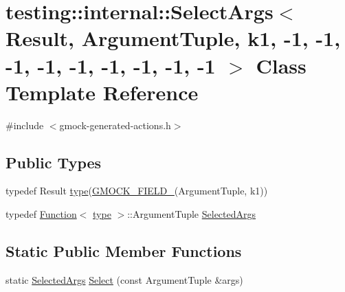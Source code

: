\hypertarget{classtesting_1_1internal_1_1SelectArgs_3_01Result_00_01ArgumentTuple_00_01k1_00_01-1_00_01-1_00_6a5fc7802a60cf36c89bd10623cc9552}{}\section{testing\+::internal\+::Select\+Args$<$ Result, Argument\+Tuple, k1, -\/1, -\/1, -\/1, -\/1, -\/1, -\/1, -\/1, -\/1, -\/1 $>$ Class Template Reference}
\label{classtesting_1_1internal_1_1SelectArgs_3_01Result_00_01ArgumentTuple_00_01k1_00_01-1_00_01-1_00_6a5fc7802a60cf36c89bd10623cc9552}


{\ttfamily \#include $<$gmock-\/generated-\/actions.\+h$>$}

\subsection*{Public Types}
\begin{DoxyCompactItemize}
\item 
typedef Result \mbox{\hyperlink{classtesting_1_1internal_1_1SelectArgs_3_01Result_00_01ArgumentTuple_00_01k1_00_01-1_00_01-1_00_6a5fc7802a60cf36c89bd10623cc9552_af1aee025a91b513b1d90a200748377dc}{type}}(\mbox{\hyperlink{gmock-generated-actions_8h_a6eb3ce92b0613603057a20ec9e593317}{G\+M\+O\+C\+K\+\_\+\+F\+I\+E\+L\+D\+\_\+}}(Argument\+Tuple, k1))
\item 
typedef \mbox{\hyperlink{structtesting_1_1internal_1_1Function}{Function}}$<$ \mbox{\hyperlink{classtesting_1_1internal_1_1SelectArgs_3_01Result_00_01ArgumentTuple_00_01k1_00_01-1_00_01-1_00_6a5fc7802a60cf36c89bd10623cc9552_af1aee025a91b513b1d90a200748377dc}{type}} $>$\+::Argument\+Tuple \mbox{\hyperlink{classtesting_1_1internal_1_1SelectArgs_3_01Result_00_01ArgumentTuple_00_01k1_00_01-1_00_01-1_00_6a5fc7802a60cf36c89bd10623cc9552_a40e5cbd362d7bdd16d0d60a39b7e5c14}{Selected\+Args}}
\end{DoxyCompactItemize}
\subsection*{Static Public Member Functions}
\begin{DoxyCompactItemize}
\item 
static \mbox{\hyperlink{classtesting_1_1internal_1_1SelectArgs_3_01Result_00_01ArgumentTuple_00_01k1_00_01-1_00_01-1_00_6a5fc7802a60cf36c89bd10623cc9552_a40e5cbd362d7bdd16d0d60a39b7e5c14}{Selected\+Args}} \mbox{\hyperlink{classtesting_1_1internal_1_1SelectArgs_3_01Result_00_01ArgumentTuple_00_01k1_00_01-1_00_01-1_00_6a5fc7802a60cf36c89bd10623cc9552_a7aaf6f5192da4e05fbc2bf595418546b}{Select}} (const Argument\+Tuple \&args)
\end{DoxyCompactItemize}


